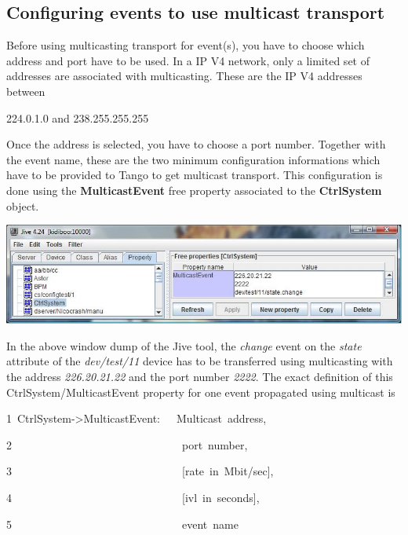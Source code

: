 \subsection{Configuring events to use multicast transport}

Before using multicasting transport for event(s), you have to choose
which address and port have to be used. In a IP V4 network, only a
limited set of addresses are associated with multicasting. These are
the IP V4 addresses between \begin{center}224.0.1.0 and 238.255.255.255\end{center}
Once the address is selected, you have to choose a port number. Together
with the event name, these are the two minimum configuration informations
which have to be provided to Tango to get multicast transport. This
configuration is done using the \textbf{MulticastEvent}
free property associated to the \textbf{CtrlSystem}
object. \begin{center}

\includegraphics[scale=0.7]{advanced/jive_simpl}\end{center}

In the above window dump of the Jive tool, the \emph{change} event
on the \emph{state} attribute of the \emph{dev/test/11} device has
to be transferred using multicasting with the address \emph{226.20.21.22}
and the port number \emph{2222}. The exact definition of this CtrlSystem/MulticastEvent
property for one event propagated using multicast is


\begin{lyxcode}
1~CtrlSystem->MulticastEvent:~~~Multicast~address,

2~~~~~~~~~~~~~~~~~~~~~~~~~~~~~~~port~number,

3~~~~~~~~~~~~~~~~~~~~~~~~~~~~~~~{[}rate~in~Mbit/sec{]},

4~~~~~~~~~~~~~~~~~~~~~~~~~~~~~~~{[}ivl~in~seconds{]},

5~~~~~~~~~~~~~~~~~~~~~~~~~~~~~~~event~name
\end{lyxcode}


